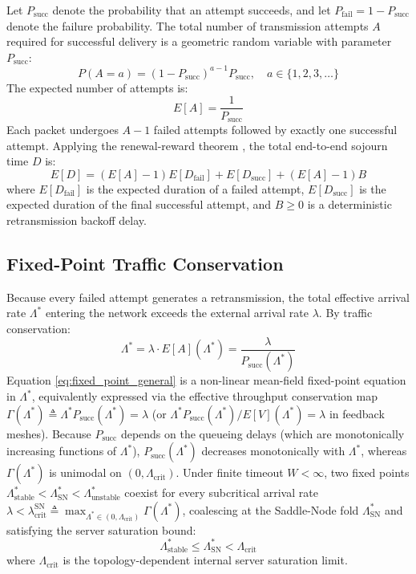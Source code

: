 \documentclass[journal,compsoc]{IEEEtran}
\begin{document}
Let $P_{\text{succ}}$ denote the probability that an attempt succeeds, and let $P_{\text{fail}} = 1 - P_{\text{succ}}$ denote the failure probability. The total number of transmission attempts $A$ required for successful delivery is a geometric random variable with parameter $P_{\text{succ}}$:
\begin{equation}
P(A = a) = (1 - P_{\text{succ}})^{a-1} P_{\text{succ}}, \quad a \in \{1, 2, 3, \dots\}
\end{equation}
The expected number of attempts is:
\begin{equation}
E[A] = \frac{1}{P_{\text{succ}}}
\end{equation}
Each packet undergoes $A - 1$ failed attempts followed by exactly one successful attempt. Applying the renewal-reward theorem \cite{ross1996stochastic}, the total end-to-end sojourn time $D$ is:
\begin{equation}
E[D] = (E[A] - 1) E[D_{\text{fail}}] + E[D_{\text{succ}}] + (E[A] - 1) B
\label{eq:general_delay}
\end{equation}
where $E[D_{\text{fail}}]$ is the expected duration of a failed attempt, $E[D_{\text{succ}}]$ is the expected duration of the final successful attempt, and $B \ge 0$ is a deterministic retransmission backoff delay.

\subsection{Fixed-Point Traffic Conservation}
Because every failed attempt generates a retransmission, the total effective arrival rate $\Lambda^*$ entering the network exceeds the external arrival rate $\lambda$. By traffic conservation:
\begin{equation}
\Lambda^* = \lambda \cdot E[A](\Lambda^*) = \frac{\lambda}{P_{\text{succ}}(\Lambda^*)}
\label{eq:fixed_point_general}
\end{equation}
Equation \eqref{eq:fixed_point_general} is a non-linear mean-field fixed-point equation in $\Lambda^*$, equivalently expressed via the effective throughput conservation map $\Gamma(\Lambda^*) \triangleq \Lambda^* P_{\text{succ}}(\Lambda^*) = \lambda$ (or $\Lambda^* P_{\text{succ}}(\Lambda^*)/E[V](\Lambda^*) = \lambda$ in feedback meshes). Because $P_{\text{succ}}$ depends on the queueing delays (which are monotonically increasing functions of $\Lambda^*$), $P_{\text{succ}}(\Lambda^*)$ decreases monotonically with $\Lambda^*$, whereas $\Gamma(\Lambda^*)$ is unimodal on $(0, \Lambda_{\text{crit}})$. Under finite timeout $W < \infty$, two fixed points $\Lambda_{\text{stable}}^* < \Lambda_{\text{SN}}^* < \Lambda_{\text{unstable}}^*$ coexist for every subcritical arrival rate $\lambda < \lambda_{\text{crit}}^{\text{SN}} \triangleq \max_{\Lambda^* \in (0, \Lambda_{\text{crit}})} \Gamma(\Lambda^*)$, coalescing at the Saddle-Node fold $\Lambda_{\text{SN}}^*$ and satisfying the server saturation bound:
\begin{equation}
\Lambda_{\text{stable}}^* \le \Lambda_{\text{SN}}^* < \Lambda_{\text{crit}}
\end{equation}
where $\Lambda_{\text{crit}}$ is the topology-dependent internal server saturation limit.
\end{document}
